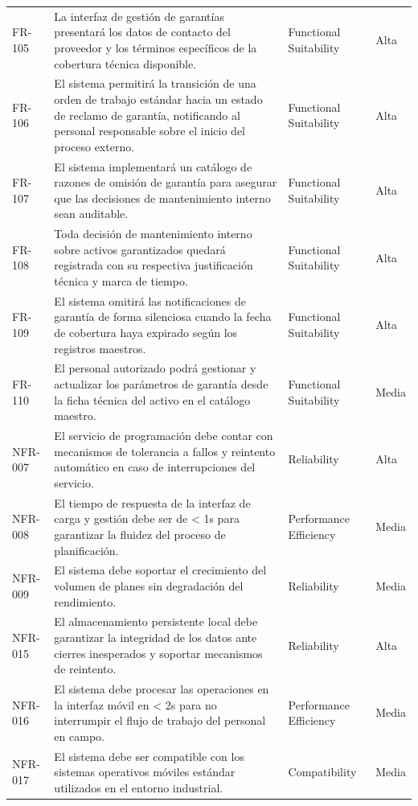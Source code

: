 \begin{longtable}{>{\raggedright\arraybackslash}p{} >{\raggedright\arraybackslash}p{} >{\raggedright\arraybackslash}p{} >{\raggedright\arraybackslash}p{}}
FR-105 & La interfaz de gestión de garantías presentará los datos de contacto del proveedor y los términos específicos de la cobertura técnica disponible. & Functional Suitability & Alta \\
FR-106 & El sistema permitirá la transición de una orden de trabajo estándar hacia un estado de reclamo de garantía, notificando al personal responsable sobre el inicio del proceso externo. & Functional Suitability & Alta \\
FR-107 & El sistema implementará un catálogo de razones de omisión de garantía para asegurar que las decisiones de mantenimiento interno sean auditable. & Functional Suitability & Alta \\
FR-108 & Toda decisión de mantenimiento interno sobre activos garantizados quedará registrada con su respectiva justificación técnica y marca de tiempo. & Functional Suitability & Alta \\
FR-109 & El sistema omitirá las notificaciones de garantía de forma silenciosa cuando la fecha de cobertura haya expirado según los registros maestros. & Functional Suitability & Alta \\
FR-110 & El personal autorizado podrá gestionar y actualizar los parámetros de garantía desde la ficha técnica del activo en el catálogo maestro. & Functional Suitability & Media \\
NFR-007 & El servicio de programación debe contar con mecanismos de tolerancia a fallos y reintento automático en caso de interrupciones del servicio. & Reliability & Alta \\
NFR-008 & El tiempo de respuesta de la interfaz de carga y gestión debe ser de < 1s para garantizar la fluidez del proceso de planificación. & Performance Efficiency & Media \\
NFR-009 & El sistema debe soportar el crecimiento del volumen de planes sin degradación del rendimiento. & Reliability & Media \\
NFR-015 & El almacenamiento persistente local debe garantizar la integridad de los datos ante cierres inesperados y soportar mecanismos de reintento. & Reliability & Alta \\
NFR-016 & El sistema debe procesar las operaciones en la interfaz móvil en < 2s para no interrumpir el flujo de trabajo del personal en campo. & Performance Efficiency & Media \\
NFR-017 & El sistema debe ser compatible con los sistemas operativos móviles estándar utilizados en el entorno industrial. & Compatibility & Media \\

\end{longtable}
